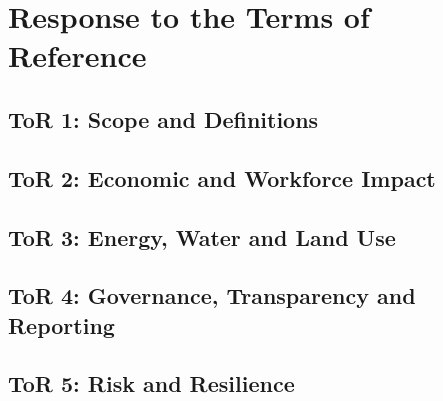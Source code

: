 \chapter{Response to the Terms of Reference}
\label{ch:tor}


\section{ToR 1: Scope and Definitions}
\label{sec:tor:1}

\lipsum[1]

\section{ToR 2: Economic and Workforce Impact}
\label{sec:tor:2}

\lipsum[2]

\section{ToR 3: Energy, Water and Land Use}
\label{sec:tor:3}

\lipsum[3]

\section{ToR 4: Governance, Transparency and Reporting}
\label{sec:tor:4}

\lipsum[4]

\section{ToR 5: Risk and Resilience}
\label{sec:tor:5}

\lipsum[5]
